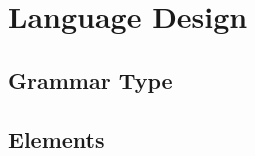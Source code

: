 \documentclass[../InterneDSLs.tex]{subfiles}
\begin{document}
\section{Language Design}

\subsection{Grammar Type}

\subsection{Elements}
\end{document}
